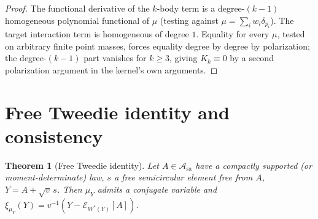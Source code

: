 \documentclass[11pt]{article}
\newcommand{\Asa}{\mathcal{A}_{\mathrm{sa}}}
\newcommand{\Econd}[1]{\mathcal{E}_{#1}}
\theoremstyle{plain}
\newtheorem{theorem}{Theorem}[section]
\theoremstyle{definition}
\theoremstyle{remark}
\begin{document}
\begin{proof}
The functional derivative of the $k$-body term is a degree-$(k-1)$ homogeneous
polynomial functional of $\mu$ (testing against $\mu=\sum_iw_i\delta_{p_i}$). The
target interaction term is homogeneous of degree $1$. Equality for every $\mu$,
tested on arbitrary finite point masses, forces equality degree by degree by
polarization; the degree-$(k-1)$ part vanishes for $k\ge3$, giving $K_k\equiv0$ by a
second polarization argument in the kernel's own arguments.
\end{proof}

\section{Free Tweedie identity and consistency}\label{app:tweedie}

\begin{theorem}[Free Tweedie identity]\label{thm:freetweedie}
Let $A\in\Asa$ have a compactly supported (or moment-determinate) law, $s$ a free
semicircular element free from $A$, $Y=A+\sqrt v\,s$. Then $\mu_Y$ admits a conjugate
variable and $\xi_{\mu_Y}(Y)=v^{-1}(Y-\Econd{W^*(Y)}[A])$.
\end{theorem}
\end{document}
